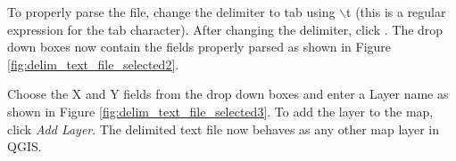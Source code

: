 To properly parse the file, change the delimiter to tab using \mbox{$\backslash$}t (this is a regular expression for the tab character).
After changing the delimiter, click .
The drop down boxes now contain the fields properly parsed as shown in Figure
\ref{fig:delim_text_file_selected2}.


Choose the X and Y fields from the drop down boxes and enter a Layer name as shown in Figure \ref{fig:delim_text_file_selected3}.
To add the layer to the map, click {\em Add Layer}. The delimited text file now behaves as any other map layer in QGIS.